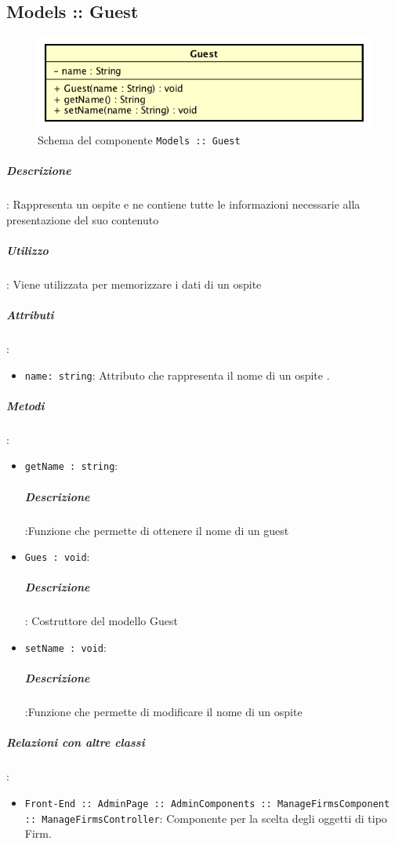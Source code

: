 \documentclass[../ManualeSviluppatore_v1.0.0.tex]{subfiles}
\begin{document}
	\subsection{Models :: Guest}
	\begin{figure}[!h]
		\centering
		\includegraphics[scale=0.6]{Architettura/Front-End/Models/Guest.png}
		\caption{Schema del componente \texttt{Models :: Guest}}
	\end{figure}

		\subparagraph{Descrizione}: Rappresenta un ospite e ne contiene tutte le informazioni necessarie alla presentazione del suo contenuto
		\subparagraph{Utilizzo}: Viene utilizzata per memorizzare i dati di un ospite
		\subparagraph{Attributi}:
		      \begin{itemize}
		      	\item \texttt{name: string}:
		      	      Attributo che rappresenta il nome di un ospite
		      	      .
		      \end{itemize}
		\subparagraph{Metodi}:
		      \begin{itemize}
		      	\item \texttt{getName : string}:
		      	      \subparagraph{Descrizione}:Funzione che permette di ottenere il nome di un guest

		      	\item \texttt{Gues : void}:
		      	     \subparagraph{Descrizione}: Costruttore del modello Guest

		      	\item \texttt{setName : void}:
		      	      \subparagraph{Descrizione}:Funzione che permette di modificare il nome di un ospite
		      \end{itemize}

		\subparagraph{Relazioni con altre classi}:
		      \begin{itemize}
		      	\item \texttt{Front-End :: AdminPage :: AdminComponents :: ManageFirmsComponent :: ManageFirmsController}: Componente per la scelta degli oggetti di tipo Firm.
		      \end{itemize}
\end{document}
